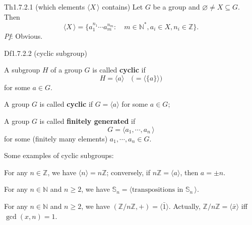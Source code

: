 \documentclass{article}
\begin{document}
\begin{Th}{Th1.7.2.1 (which elements $\langle X\,\rangle$ contains)}
    Let $G$ be a group and $\varnothing\neq X\subseteq G$. Then
    $$ \langle X\,\rangle = \Big\{a_1^{n_1}\cdots a_m^{n_m}: \quad m\in\mathbb{N}^\ast, a_i\in X, n_i\in\mathbb{Z}\Big\}. $$
    \tcblower
    \textit{Pf}: Obvious.
\end{Th}

\begin{Df}{Df1.7.2.2 (cyclic subgroup)}
    \begin{compactenum}
        \item A subgroup $H$ of a group $G$ is called \textbf{cyclic} if 
        $$ H = \langle a\rangle \quad \Big( = \langle \{a\} \rangle \Big) $$
        for some $a\in G$. 
        \item A group $G$ is called \textbf{cyclic} if $G = \langle a\rangle$ for some $a\in G$;
        \item A group $G$ is called \textbf{finitely generated} if 
        $$ G = \langle a_1, \cdots, a_n\,\rangle $$
        for some (finitely many elements) $a_1, \cdots, a_n\in G$.
    \end{compactenum}
\end{Df}

\begin{Rmk}{}
    \textcolor{Th}{Some examples of cyclic subgroups:
    \begin{compactenum}
        \item For any $n\in\mathbb{Z}$, we have $\langle n\rangle = n\mathbb{Z}$; conversely, if $n\mathbb{Z} = \langle a\rangle$, then $a = \pm n$.
        \item For any $n\in\mathbb{N}$ and $n\geq 2$, we have $\mathbb{S}_n = \langle \text{transpositions in }\mathbb{S}_n\,\rangle$.
        \item For any $n\in\mathbb{N}$ and $n\geq 2$, we have $(\mathbb{Z}/n\mathbb{Z}, +) = \langle \bar{1}\rangle$. Actually, $\mathbb{Z}/n\mathbb{Z} = \langle \bar{x}\rangle$ iff $\gcd(x, n) = 1$.
    \end{compactenum}}
\end{Rmk}
\end{document}
